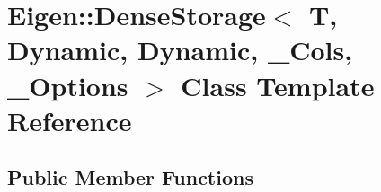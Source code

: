 \hypertarget{class_eigen_1_1_dense_storage_3_01_t_00_01_dynamic_00_01_dynamic_00_01___cols_00_01___options_01_4}{}\section{Eigen\+:\+:Dense\+Storage$<$ T, Dynamic, Dynamic, \+\_\+\+Cols, \+\_\+\+Options $>$ Class Template Reference}
\label{class_eigen_1_1_dense_storage_3_01_t_00_01_dynamic_00_01_dynamic_00_01___cols_00_01___options_01_4}
\subsection*{Public Member Functions}

